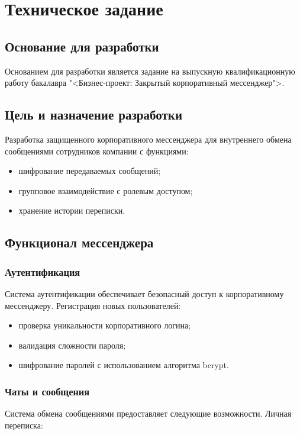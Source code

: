 \section{Техническое задание}
\subsection{Основание для разработки}

Основанием для разработки является задание на выпускную квалификационную работу бакалавра "<Бизнес-проект: Закрытый корпоративный мессенджер">.

\subsection{Цель и назначение разработки}

Разработка защищенного корпоративного мессенджера для внутреннего обмена сообщениями сотрудников компании с функциями:
\begin{itemize}
	\item шифрование передаваемых сообщений;
	\item групповое взаимодействие с ролевым доступом;
	\item хранение истории переписки.
\end{itemize}

	
\subsection{Функционал мессенджера}

\subsubsection{Аутентификация}
Система аутентификации обеспечивает безопасный доступ к корпоративному мессенджеру.
Регистрация новых пользователей:

	\begin{itemize}
		\item проверка уникальности корпоративного логина;
		\item валидация сложности пароля;
		\item шифрование паролей с использованием алгоритма bcrypt.
	\end{itemize}

\subsubsection{Чаты и сообщения}
Система обмена сообщениями предоставляет следующие возможности.
Личная переписка:

